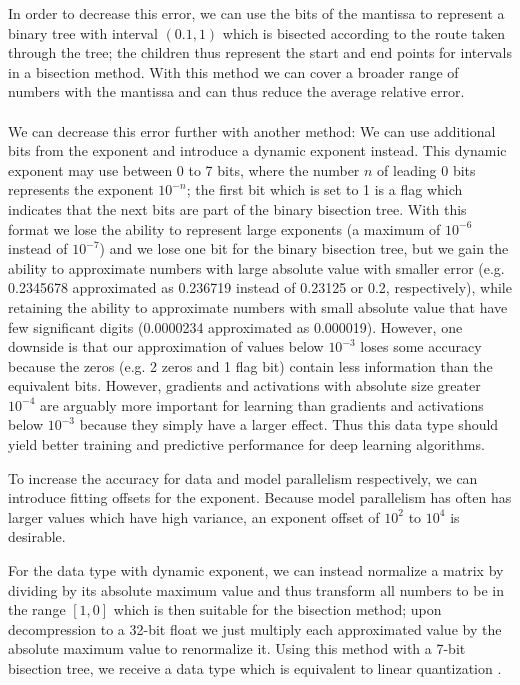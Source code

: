 \documentclass{article} %
\begin{document}
In order to decrease this error, we can use the bits of the mantissa to represent a binary tree with interval $(0.1,1)$ which is bisected according to the route taken through the tree; the children thus represent the start and end points for intervals in a bisection method. With this method we can cover a broader range of numbers with the mantissa and can thus reduce the average relative error. \\\\
We can decrease this error further with another method: We can use additional bits from the exponent and introduce a dynamic exponent instead. This dynamic exponent may use between 0 to 7 bits, where the number $n$ of leading 0 bits represents the exponent $10^{-n}$; the first bit which is set to 1 is a flag which indicates that the next bits are part of the binary bisection tree. With this format we lose the ability to represent large exponents (a maximum of $10^{-6}$ instead of $10^{-7}$) and we lose one bit for the binary bisection tree, but we gain the ability to approximate numbers with large absolute value with smaller error (e.g. 0.2345678 approximated as 0.236719 instead of 0.23125 or 0.2, respectively), while retaining the ability to approximate numbers with small absolute value that have few significant digits (0.0000234 approximated as 0.000019). However, one downside is that our approximation of values below $10^{-3}$ loses some accuracy because the zeros (e.g. 2 zeros and 1 flag bit) contain less information than the equivalent bits. However, gradients and activations with absolute size greater $10^{-4}$ are arguably more important for learning than gradients and activations below $10^{-3}$ because they simply have a larger effect. Thus this data type should yield better training and predictive performance for deep learning algorithms. 

To increase the accuracy for data and model parallelism respectively, we can introduce fitting offsets for the exponent. Because model parallelism has often has larger values which have high variance, an exponent offset of $10^2$ to $10^4$ is desirable. 

For the data type with dynamic exponent, we can instead normalize a matrix by dividing by its absolute maximum value and thus transform all numbers to be in the range $[1,0]$ which is then suitable for the bisection method; upon decompression to a 32-bit float we just multiply each approximated value by the absolute maximum value to renormalize it. Using this method with a 7-bit bisection tree, we receive a data type which is equivalent to linear quantization \citep{vanhoucke2011improving}.
\end{document}

